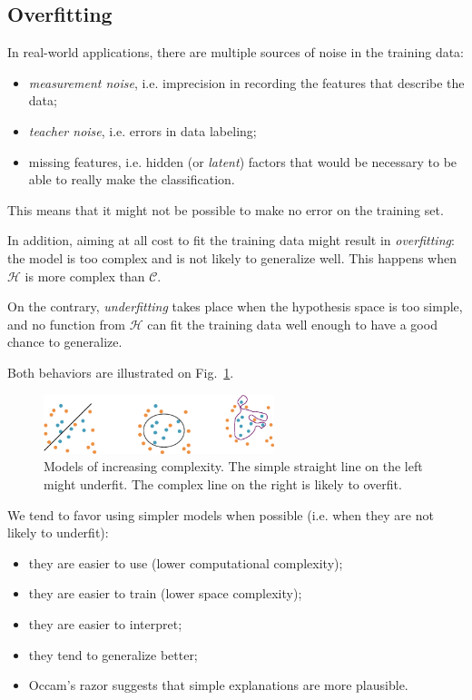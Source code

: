 \documentclass[a4paper,12pt]{article}
\newcommand{\cc}{\mathcal{C}}
\newcommand{\hh}{\mathcal{H}}
\begin{document}
\subsection{Overfitting}
In real-world applications, there are multiple sources of noise in the training data:
\begin{itemize}
\item {\em measurement noise}, i.e. imprecision in recording the features that describe the data;
\item {\em teacher noise}, i.e. errors in data labeling;
\item missing features, i.e. hidden (or {\em latent}) factors that would be necessary to be able to really make the classification.
\end{itemize}
This means that it might not be possible to make no error on the training set.

In addition, aiming at all cost to fit the training data might result in {\em overfitting}: the model is too complex and is not likely to generalize well. This happens when $\hh$ is more complex than $\cc$.

On the contrary, {\em underfitting} takes place when the hypothesis space is too simple, and no function from $\hh$ can fit the training data well enough to have a good chance to generalize. 

Both behaviors are illustrated on Fig.~\ref{fig:model_complexity}.
\begin{figure}[h]
  \centering
  \includegraphics[width=0.6\textwidth]{figures/model_complexity}
  \caption{Models of increasing complexity. The simple straight line on the left might underfit. The complex line on the right is likely to overfit. }
  \label{fig:model_complexity}
\end{figure}

We tend to favor using simpler models when possible (i.e. when they are not likely to underfit): 
\begin{itemize}
\item they are easier to use (lower computational complexity);
\item they are easier to train (lower space complexity);
\item they are easier to interpret;
\item they tend to generalize better;
\item Occam's razor suggests that simple explanations are more plausible.
\end{itemize}
\end{document}
